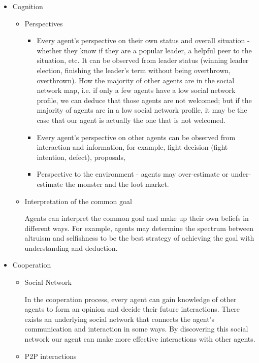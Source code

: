 \begin{itemize}
    \item Cognition
          \begin{itemize}
              \item Perspectives
                    \begin{itemize}
                        \item Every agent's perspective on their own status and overall situation - whether they know if they are a popular leader, a helpful peer to the situation, etc. It can be observed from leader status (winning leader election, finishing the leader's term without being overthrown, overthrown). How the majority of other agents are in the social network map, i.e. if only a few agents have a low social network profile, we can deduce that those agents are not welcomed; but if the majority of agents are in a low social network profile, it may be the case that our agent is actually the one that is not welcomed.

                        \item Every agent's perspective on other agents can be observed from interaction and information, for example, fight decision (fight intention, defect), proposals,
                        \item Perspective to the environment - agents may over-estimate or under-estimate the monster and the loot market.
                    \end{itemize}
              \item Interpretation of the common goal

                    Agents can interpret the common goal and make up their own beliefs in different ways. For example, agents may determine the spectrum between altruism and selfishness to be the best strategy of achieving the goal with understanding and deduction.
          \end{itemize}
    \item Cooperation
          \begin{itemize}
              \item Social Network

                    In the cooperation process, every agent can gain knowledge of other agents to form an opinion and decide their future interactions. There exists an underlying social network that connects the agent's communication and interaction in some ways. By discovering this social network our agent can make more effective interactions with other agents.
              \item P2P interactions


\end{itemize}
\end{itemize}
